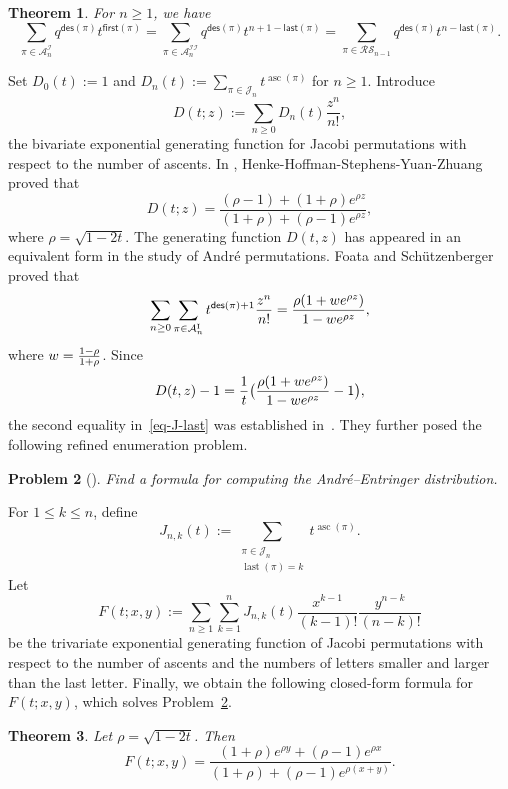 \documentclass[12pt]{article}
\numberwithin{equation}{section}
\theoremstyle{plain}
\newtheorem{theorem}{Theorem}[section]
\newtheorem{problem}[theorem]{Problem}
\def\des{\mathsf{des}}
\def\first{\mathsf{first}}
\def\last{\mathsf{last}}
\begin{document}
  \begin{theorem}\label{thm-main2}
  	For $n\geq 1$, we have 
  	\begin{equation}\label{eq-equidistribution}
\sum_{\pi\in \mathcal{A}^{\mathcal{I}}_{n}}q^{\des(\pi)} t^{\first(\pi)} =	\sum_{\pi\in \mathcal{A}^{\mathcal{II}}_{n}}q^{\des(\pi)} t^{n+1-\last(\pi)}=\sum_{\pi\in \mathcal{RS}_{n-1}} q^{\des(\pi)}t^{n-\last(\pi)}.
  	\end{equation}
  	\end{theorem}
  	Set $D_0(t):=1$ and  $D_n(t):=\sum_{\pi\in\mathcal J_n}t^{\operatorname{asc}(\pi)}$ for $n\geq1$. 
Introduce
  \[
  	D(t;z):=\sum_{n\geq0}D_n(t)\frac{z^n}{n!},
  	\]
 the bivariate exponential generating function for Jacobi permutations with respect to the number of ascents.
  	In \cite{HHSSY25}, Henke-Hoffman-Stephens-Yuan-Zhuang proved that 
  	\begin{equation}
  		D(t;z)
  		=
  		\frac{(\rho-1)+(1+\rho)e^{\rho z}}
  		{(1+\rho)+(\rho-1)e^{\rho z}},
  		\label{eq:jacobi-D-closed}
  	\end{equation}
  	where $\rho=\sqrt{1-2t}$. 
    The generating function $D(t,z)$ has appeared in an equivalent form in the study of Andr\'e
    permutations.  Foata and Sch{\"u}tzenberger  \cite{foata1973nombres} proved that
    $$
    \sum_{n\geq 0}\sum\limits_{\pi\in \mathcal{A}^{\mathrm{I}}_n}t^{\des(\pi)+1}{z^n\over n!}={\rho(1+we^{\rho z})\over 1-we^{\rho z}},
    $$
  where   $w={1-\rho\over 1+\rho}$.  Since $$D(t,z)-1={1\over t}\big({\rho(1+we^{\rho z})\over 1-we^{\rho z}}-1\big),$$  the second equality in~\eqref{eq-J-last} was established in~\cite{HHSSY25}. They further posed the following refined enumeration problem. 
  
  \begin{problem}[]
  \label{problem:1}
  Find a formula for computing the Andr\'e–Entringer distribution.
  \end{problem}
   
   
   
  For $1\leq k\leq n$, define 
  \[
  J_{n,k}(t)
  :=
  \sum_{\substack{\pi\in\mathcal J_n\\
  		\operatorname{last}(\pi)=k}}
  t^{\operatorname{asc}(\pi)}.
  \]
  Let
$$
  	F(t;x,y):=\sum_{n\geq1}\sum_{k=1}^{n}
       J_{n,k}(t)
  	\frac{x^{k-1}}{(k-1)!}
  	\frac{y^{n-k}}{(n-k)!}
$$
  be the trivariate exponential generating function of Jacobi permutations with respect to the number of ascents and the numbers of letters smaller and larger than the last letter. 
 Finally, we obtain the following closed-form formula for $F(t;x,y)$, which solves Problem~\ref{problem:1}. 
  \begin{theorem}
  	\label{thm:jacobi-F-closed}
  	Let $\rho=\sqrt{1-2t}$.
  	Then
  	\begin{equation}
  		F(t;x,y)
  		=
  		\frac{(1+\rho)e^{\rho y}+(\rho-1)e^{\rho x}}
  		{(1+\rho)+(\rho-1)e^{\rho(x+y)}}.
  		\label{eq:jacobi-F-closed}
  	\end{equation}
  \end{theorem}
  
\end{document}
